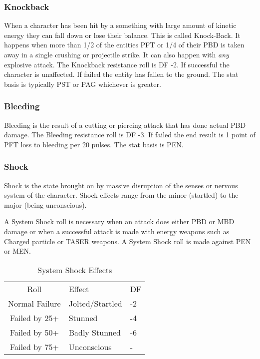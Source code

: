 \subsubsection{Knockback}

When a character has been hit by a something with large amount of kinetic
energy they can fall down or lose their balance. This is called Knock-Back.
It happens when more than 1/2 of the entities PFT or 1/4 of their PBD is taken
away in a single crushing or projectile strike. It can also happen with {\em any}
explosive attack. The Knockback resistance roll is DF -2. If successful the
character is unaffected. If failed the entity has fallen to the ground.
The stat basis is typically PST or PAG whichever is greater.

\subsubsection{Bleeding}

Bleeding is the result of a cutting or piercing attack that has done
actual PBD damage. The Bleeding resistance roll is DF -3. If failed the
end result is 1 point of PFT loss to bleeding per 20 pulses. The stat
basis is PEN.

\subsubsection{Shock}

Shock is the state brought on by massive disruption of the senses or
nervous system of the character. Shock effects range from the minor
(startled) to the major (being unconscious).

A System Shock roll is necessary when an attack does
either PBD or MBD damage or when a successful attack is made with
energy weapons such as Charged particle or TASER weapons.
A System Shock roll is made against PEN or MEN.

\begin{table}
	\begin{tabular}{cll}
	Roll			  & Effect & DF \\
	Normal Failure	  & Jolted/Startled & -2  \\
	Failed by 25+	   & Stunned & -4  \\
	Failed by 50+	   & Badly Stunned & -6 \\
    Failed by 75+     & Unconscious & - \\
	\end{tabular}
    \caption{System Shock Effects}
\end{table}

